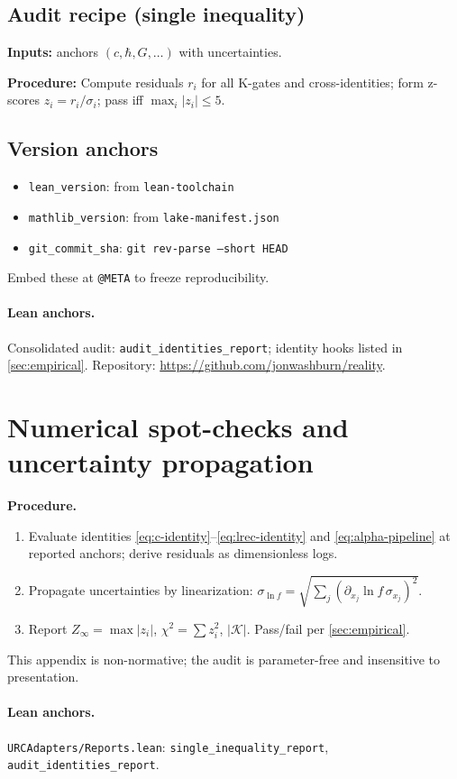 \documentclass[11pt]{article}
\begin{document}
\subsection{Audit recipe (single inequality)}
\textbf{Inputs:} anchors \((c,\hbar,G,\dots)\) with uncertainties. 

\textbf{Procedure:} Compute residuals \(r_i\) for all K\mbox{-}gates and cross\mbox{-}identities; form z\mbox{-}scores \(z_i=r_i/\sigma_i\); pass iff \(\max_i|z_i|\le 5\).

\subsection{Version anchors}
\begin{itemize}
  \item \texttt{lean\_version}: from \texttt{lean-toolchain}
  \item \texttt{mathlib\_version}: from \texttt{lake-manifest.json}
  \item \texttt{git\_commit\_sha}: \texttt{git rev-parse --short HEAD}
\end{itemize}
Embed these at \texttt{@META} to freeze reproducibility.

\paragraph{Lean anchors.} Consolidated audit:  \texttt{audit\_identities\_report}; identity hooks listed in \cref{sec:empirical}. Repository: \url{https://github.com/jonwashburn/reality}.

\section{Numerical spot\mbox{-}checks and uncertainty propagation}\label{app:numerics}
\textbf{Procedure.}
\begin{enumerate}
  \item Evaluate identities \eqref{eq:c-identity}--\eqref{eq:lrec-identity} and \eqref{eq:alpha-pipeline} at reported anchors; derive residuals as dimensionless logs.
  \item Propagate uncertainties by linearization: \(\sigma_{\ln f}=\sqrt{\sum_j (\partial_{x_j}\ln f\,\sigma_{x_j})^2}\).
  \item Report \(Z_\infty=\max|z_i|\), \(\chi^2=\sum z_i^2\), \(|\mathcal{K}|\). Pass/fail per \cref{sec:empirical}.
\end{enumerate}
This appendix is non\mbox{-}normative; the audit is parameter\mbox{-}free and insensitive to presentation.

\paragraph{Lean anchors.} \texttt{URCAdapters/Reports.lean}: \texttt{single\_inequality\_report}, \texttt{audit\_identities\_report}.
\end{document}
